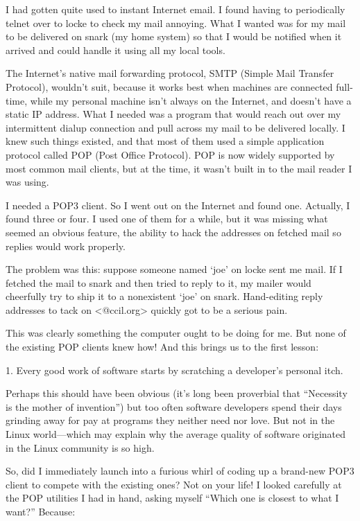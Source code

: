 \documentclass[a4paper,12pt,UTF8,twoside]{ctexbook}
\begin{document}
I had gotten quite used to instant Internet email. I found having to periodically telnet over to locke to check my mail annoying. What I wanted was for my mail to be delivered on snark (my home system) so that I would be notified when it arrived and could handle it using all my local tools.

The Internet's native mail forwarding protocol, SMTP (Simple Mail Transfer Protocol), wouldn't suit, because it works best when machines are connected full-time, while my personal machine isn't always on the Internet, and doesn't have a static IP address. What I needed was a program that would reach out over my intermittent dialup connection and pull across my mail to be delivered locally. I knew such things existed, and that most of them used a simple application protocol called POP (Post Office Protocol). POP is now widely supported by most common mail clients, but at the time, it wasn't built in to the mail reader I was using.

I needed a POP3 client. So I went out on the Internet and found one. Actually, I found three or four. I used one of them for a while, but it was missing what seemed an obvious feature, the ability to hack the addresses on fetched mail so replies would work properly.

The problem was this: suppose someone named `joe' on locke sent me mail. If I fetched the mail to snark and then tried to reply to it, my mailer would cheerfully try to ship it to a nonexistent `joe' on snark. Hand-editing reply addresses to tack on <@ccil.org> quickly got to be a serious pain.

This was clearly something the computer ought to be doing for me. But none of the existing POP clients knew how! And this brings us to the first lesson:

1. Every good work of software starts by scratching a developer's personal itch.

Perhaps this should have been obvious (it's long been proverbial that ``Necessity is the mother of invention'') but too often software developers spend their days grinding away for pay at programs they neither need nor love. But not in the Linux world—which may explain why the average quality of software originated in the Linux community is so high.

So, did I immediately launch into a furious whirl of coding up a brand-new POP3 client to compete with the existing ones? Not on your life! I looked carefully at the POP utilities I had in hand, asking myself ``Which one is closest to what I want?'' Because:
\end{document}
